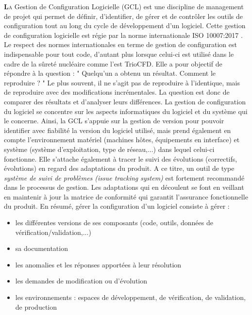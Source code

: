 \lhead{}

\lettrine[lines=2,slope=0pt,nindent=4pt]{\textbf{L}}{a} Gestion de Configuration Logicielle (GCL) est une discipline de management de projet qui permet de d\'efinir,
d'identifier, de g\'erer et de contr\^oler les outils de configuration tout au long du cycle de d\'eveloppement d'un
logiciel. Cette gestion de configuration logicielle est r\'egie par la norme internationale ISO 10007:2017 \cite{normISO}. Le respect des normes internationales en terme de gestion de configuration est indispensable pour tout code, d'autant plus lorsque celui-ci est utilisé dans le cadre de la sûreté nucléaire comme l'est TrioCFD. Elle a pour objectif de r\'epondre \`a la question : " Quelqu'un a obtenu un r\'esultat. Comment le reproduire ? " Le plus souvent, il ne s'agit pas de reproduire \`a l'identique, mais de reproduire avec des modifications incr\'ementales. La question est donc de comparer des r\'esultats et d'analyser leurs diff\'erences.\smallskip\newline
La gestion de configuration du logiciel se concentre sur les aspects informatiques du logiciel et du syst\`eme qui le concerne. Ainsi, la GCL s'appuie sur la gestion de version pour pouvoir identifier avec fiabilité la version du logiciel utilis\'e, mais prend \'egalement en compte l'environnement mat\'eriel (machines h\^otes, \'equipements en interface) et syst\`eme (syst\`eme d'exploitation, type de r\'eseau,...) dans lequel celui-ci fonctionne.\newline
Elle s'attache \'egalement \`a tracer le suivi des \'evolutions (correctifs, \'evolutions) en regard des adaptations du produit. A ce titre, un outil de type \textit{syst\`eme de suivi de probl\`emes (issue tracking system)} est fortement recommand\'e dans le processus de gestion. Les adaptations qui en d\'ecoulent se font en veillant en maintenir \`a jour la matrice de conformit\'e qui garantit l'assurance fonctionnelle du produit.\smallskip\newline
En r\'esum\'e, g\'erer la configuration d'un logiciel consiste \`a g\'erer :
\begin{itemize}
	\item les diff\'erentes versions de ses composants (code, outils, donn\'ees de v\'erification/validation,...)
	\item sa documentation
	\item les anomalies et les r\'eponses apport\'ees \`a leur r\'esolution
	\item les demandes de modification ou d'\'evolution
	\item les environnements : espaces de d\'eveloppement, de v\'erification, de validation, de production
\end{itemize}

